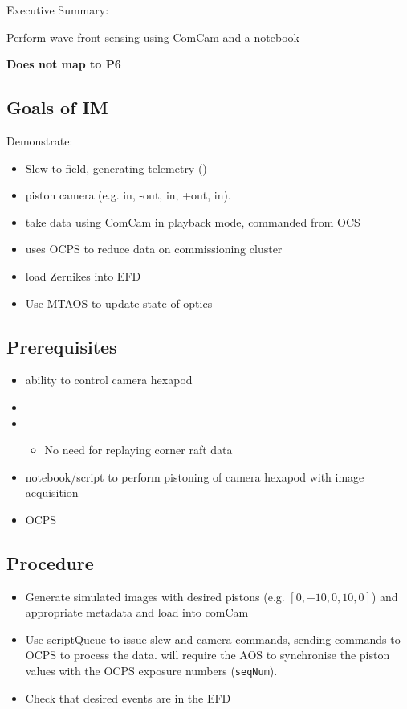 
Executive Summary:

Perform wave-front sensing using ComCam and a notebook

\textbf{Does not map to P6}

\subsection{Goals of IM}
Demonstrate:
\begin{itemize}
\item Slew to field, generating telemetry (\cf {})
\item piston camera (e.g. in, -out, in, +out, in). 
\item take data using ComCam in playback mode, commanded from OCS
\item uses \gls{OCPS} to reduce data on commissioning cluster
\item load Zernikes into \gls{EFD}
\item Use MTAOS to update state of optics
\end{itemize}

\subsection{Prerequisites}
\begin{itemize}
\item ability to control camera hexapod
\item {}
\item {}
  \begin{itemize}
  \item No need for replaying corner raft data
  \end{itemize}
\item notebook/script to perform pistoning of camera hexapod with image acquisition
\item \gls{OCPS}
\end{itemize}

\subsection{Procedure}
\begin{itemize}
\item Generate simulated images with desired pistons (e.g. $[0, -10, 0, 10, 0]$) and appropriate
  metadata and load into comCam
\item Use \gls{scriptQueue} to issue slew and camera commands, sending commands to \gls{OCPS}
      to process the data.  \Nb will require the \gls{AOS} to synchronise the piston values
      with the OCPS exposure numbers (\texttt{seqNum}).
\item Check that desired events are in the EFD
\end{itemize}
